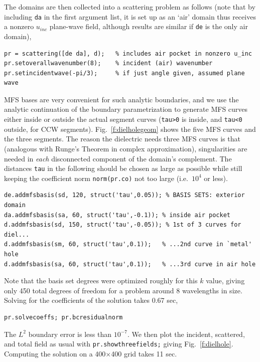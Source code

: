 The domains are then collected into a scattering problem as follows (note
that by including {\tt da} in the first argument list, it is set up as an
`air' domain thus receives a nonzero $u_{inc}$ plane-wave field, although
results are similar if {\tt de} is the only air domain),
\begin{verbatim}
pr = scattering([de da], d);   % includes air pocket in nonzero u_inc
pr.setoverallwavenumber(8);    % incident (air) wavenumber
pr.setincidentwave(-pi/3);     % if just angle given, assumed plane wave
\end{verbatim}

MFS bases are very convenient for such analytic boundaries, and we use the
analytic continuation of the boundary parametrization to generate MFS curves
either inside or outside the actual segment curves
({\tt tau>0} is inside, and {\tt tau<0} outside, for CCW segments).
Fig.~\ref{f:dielholegeom} shows the five MFS curves and the three segments.
The reason the dielectric needs three MFS curves is that (analogous
with Runge's Theorem in complex approximation), singularities are needed in
{\em each} disconnected component of the domain's complement.
The distances {\tt tau} in the following should be chosen as large as possible
while still keeping the coefficient norm {\tt norm(pr.co)} not too large
(i.e.\ $10^4$ or less).
\begin{verbatim}
de.addmfsbasis(sd, 120, struct('tau',0.05)); % BASIS SETS: exterior domain
da.addmfsbasis(sa, 60, struct('tau',-0.1)); % inside air pocket
d.addmfsbasis(sd, 150, struct('tau',-0.05)); % 1st of 3 curves for diel...
d.addmfsbasis(sm, 60, struct('tau',0.1));   % ...2nd curve in `metal' hole
d.addmfsbasis(sa, 60, struct('tau',0.1));   % ...3rd curve in air hole
\end{verbatim}
Note that the basis set degrees were optimized roughly for this $k$ value,
giving only 450 total degrees of freedom for a problem around
8 wavelengths in size.
Solving for the coefficients of the solution takes 0.67 sec,
\begin{verbatim}
pr.solvecoeffs; pr.bcresidualnorm
\end{verbatim}
The $L^2$ boundary error is less than $10^{-7}$.
We then plot the incident, scattered, and total field as usual with
{\tt pr.showthreefields;} giving Fig.~\ref{f:dielhole}.
Computing the solution on a 400$\times$400 grid takes 11 sec.

